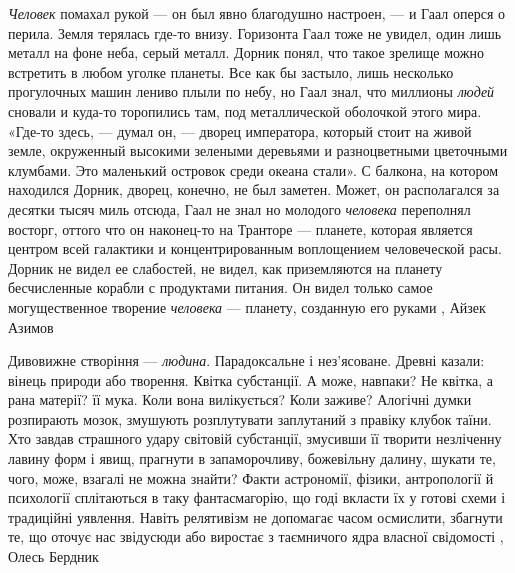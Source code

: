 \emph{Человек} помахал рукой — он был явно благодушно настроен, — и Гаал оперся о
перила. Земля терялась где-то внизу. Горизонта Гаал тоже не увидел, один лишь
металл на фоне неба, серый металл. Дорник понял, что такое зрелище можно
встретить в любом уголке планеты. Все как бы застыло, лишь несколько
прогулочных машин лениво плыли по небу, но Гаал знал, что миллионы \emph{людей}
сновали и куда-то торопились там, под металлической оболочкой этого мира.
«Где-то здесь, — думал он, — дворец императора, который стоит на живой земле,
окруженный высокими зелеными деревьями и разноцветными цветочными клумбами. Это
маленький островок среди океана стали». С балкона, на котором находился Дорник,
дворец, конечно, не был заметен. Может, он располагался за десятки тысяч миль
отсюда, Гаал не знал но молодого \emph{человека} переполнял восторг, оттого что он
наконец-то на Транторе — планете, которая является центром всей галактики и
концентрированным воплощением человеческой расы. Дорник не видел ее слабостей,
не видел, как приземляются на планету бесчисленные корабли с продуктами
питания. Он видел только самое могущественное творение \emph{человека} — планету,
созданную его руками
, Айзек Азимов

Дивовижне створіння — \emph{людина}. Парадоксальне і нез’ясоване. Древні
казали: вінець природи або творення. Квітка субстанції. А може, навпаки? Не
квітка, а рана матерії? її мука. Коли вона вилікується? Коли заживе?  Алогічні
думки розпирають мозок, змушують розплутувати заплутаний з правіку клубок
таїни. Хто завдав страшного удару світовій субстанції, змусивши її творити
незліченну лавину форм і явищ, прагнути в запаморочливу, божевільну далину,
шукати те, чого, може, взагалі не можна знайти? Факти астрономії, фізики,
антропології й психології сплітаються в таку фантасмагорію, що годі вкласти їх
у готові схеми і традиційні уявлення. Навіть релятивізм не допомагає часом
осмислити, збагнути те, що оточує нас звідусюди або виростає з таємничого ядра
власної свідомості
, Олесь Бердник
